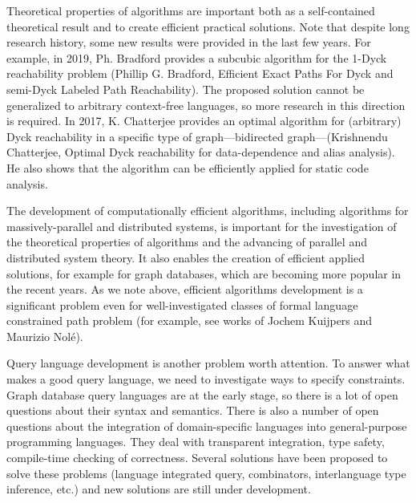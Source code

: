 \documentclass[12pt]{article}  %
\theoremstyle{remark}
\begin{document}
Theoretical properties of algorithms are important both as a self-contained theoretical result and to create efficient practical solutions.
Note that despite long research history, some new results were provided in the last few years.
For example, in 2019, Ph. Bradford provides a subcubic algorithm for the 1-Dyck reachability problem (Phillip G. Bradford, Efficient Exact Paths For Dyck and semi-Dyck Labeled Path Reachability).
The proposed solution cannot be generalized to arbitrary context-free languages, so more research in this direction is required.
In 2017, K. Chatterjee provides an optimal algorithm for (arbitrary) Dyck reachability in a specific type of graph---bidirected graph---(Krishnendu Chatterjee, Optimal Dyck reachability for data-dependence and alias analysis).
He also shows that the algorithm can be efficiently applied for static code analysis.

The development of computationally efficient algorithms, including algorithms for massively-parallel and distributed systems, is important for the investigation of the theoretical properties of algorithms and the advancing of parallel and distributed system theory.
It also enables the creation of efficient applied solutions, for example for graph databases, which are becoming more popular in the recent years.
As we note above, efficient algorithms development is a significant problem even for well-investigated classes of formal language constrained path problem (for example, see works of Jochem Kuijpers and Maurizio Nolé).

Query language development is another problem worth attention.
To answer what makes a good query language, we need to investigate ways to specify constraints.
Graph database query languages are at the early stage, so there is a lot of open questions about their syntax and semantics.
There is also a number of open questions about the integration of domain-specific languages into general-purpose programming languages.
They deal with transparent integration, type safety, compile-time checking of correctness.
Several solutions have been proposed to solve these problems (language integrated query, combinators, interlanguage type inference, etc.) and new solutions are still under development.
\end{document}
